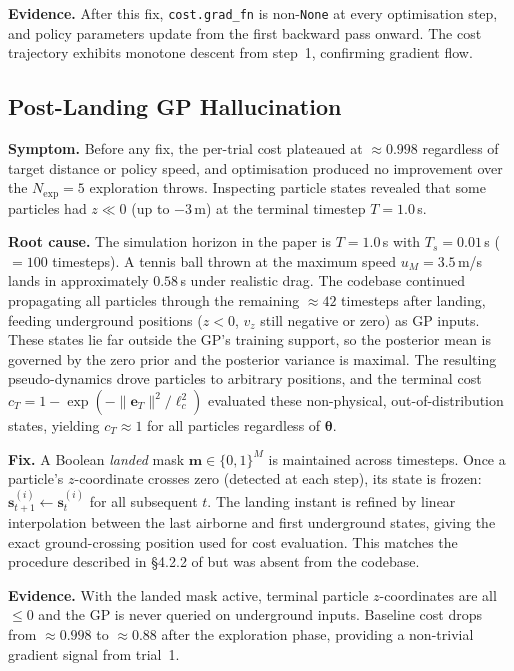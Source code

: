 \textbf{Evidence.}
After this fix, \texttt{cost.grad\_fn} is non-\texttt{None} at every optimisation
step, and policy parameters update from the first backward pass onward.
The cost trajectory exhibits monotone descent from step~1, confirming gradient flow.

\subsection{Post-Landing GP Hallucination}
\label{sec:fix_landing}

\textbf{Symptom.}
Before any fix, the per-trial cost plateaued at $\approx 0.998$ regardless of target
distance or policy speed, and optimisation produced no improvement over the
$N_{\mathrm{exp}} = 5$ exploration throws.
Inspecting particle states revealed that some particles had $z \ll 0$
(up to $-3$\,m) at the terminal timestep $T = 1.0$\,s.

\textbf{Root cause.}
The simulation horizon in the paper is $T = 1.0$\,s with $T_s = 0.01$\,s
($= 100$ timesteps).
A tennis ball thrown at the maximum speed $u_M = 3.5$\,m/s lands in approximately
$0.58$\,s under realistic drag.
The \mcpilco{} codebase continued propagating all particles through the remaining
$\approx 42$ timesteps after landing, feeding underground positions
($z < 0$, $v_z$ still negative or zero) as GP inputs.
These states lie far outside the GP's training support, so the posterior mean is
governed by the zero prior and the posterior variance is maximal.
The resulting pseudo-dynamics drove particles to arbitrary positions, and the terminal
cost $c_T = 1 - \exp(-\|\mathbf{e}_T\|^2 / \ell_c^2)$ evaluated these non-physical, out-of-distribution states,
yielding $c_T \approx 1$ for all particles regardless of $\boldsymbol{\theta}$.

\textbf{Fix.}
A Boolean \emph{landed} mask $\mathbf{m} \in \{0,1\}^M$ is maintained across
timesteps.
Once a particle's $z$-coordinate crosses zero (detected at each step), its state is
frozen: $\mathbf{s}^{(i)}_{t+1} \leftarrow \mathbf{s}^{(i)}_t$ for all subsequent $t$.
The landing instant is refined by linear interpolation between the last airborne
and first underground states, giving the exact ground-crossing position used for cost
evaluation.
This matches the procedure described in \S4.2.2 of \cite{turcato2025mcpilot} but
was absent from the \mcpilco{} codebase.

\textbf{Evidence.}
With the landed mask active, terminal particle $z$-coordinates are all $\leq 0$ and
the GP is never queried on underground inputs.
Baseline cost drops from $\approx 0.998$ to $\approx 0.88$ after the exploration
phase, providing a non-trivial gradient signal from trial~1.


